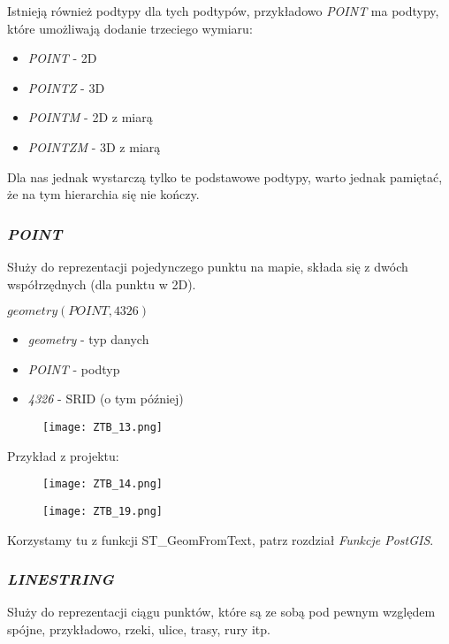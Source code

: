 \documentclass[a4paper,15pt]{article}
\newcommand{\example}[2]{
    \begin{tcolorbox}[colback=blue!5!white,colframe=blue,title={Przykład #1}]
        #2
    \end{tcolorbox}
}
\begin{document}
Istnieją również podtypy dla tych podtypów, przykładowo \textit{POINT} ma podtypy, które umożliwają dodanie trzeciego wymiaru:
\begin{itemize}
\item \textit{POINT} - 2D
\item \textit{POINTZ} - 3D
\item \textit{POINTM} - 2D z miarą
\item \textit{POINTZM} - 3D z miarą
\end{itemize}
Dla nas jednak wystarczą tylko te podstawowe podtypy, warto jednak pamiętać, że na tym hierarchia się nie kończy. 


\subsubsection{\textit{POINT}}

Służy do reprezentacji pojedynczego punktu na mapie, składa się z dwóch współrzędnych (dla punktu w 2D).

\example{- Deklaracja typu dla kolumny: \textit{geometry} z podtypem \textit{POINT}}{
$geometry(POINT,4326)$ \\
\begin{itemize}
\item \textit{geometry} - typ danych
\item \textit{POINT} - podtyp
\item \textit{4326} - SRID (o tym później)
\end{itemize}
}

\example{- utworzenie bazy danych z typem geometry(POINT, 4326)}{
\begin{figure}[H]
\centering
  \texttt{[image: ZTB\_13.png]}
\end{figure}
Przykład z projektu:
\begin{figure}[H]
\centering
  \texttt{[image: ZTB\_14.png]}
\end{figure}
}

\example{Wstawianie danych}{
\begin{figure}[H]
\centering
  \texttt{[image: ZTB\_19.png]}
\end{figure}
}
Korzystamy tu z funkcji ST\_GeomFromText, patrz rozdział \textit{Funkcje PostGIS}.


\subsubsection{\textit{LINESTRING}}
Służy do reprezentacji ciągu punktów, które są ze sobą pod pewnym względem spójne, przykładowo, rzeki, ulice, trasy, rury itp.
\end{document}
